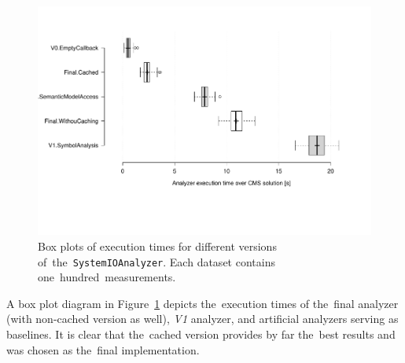 \documentclass[
  digital, %
  table,   %
  lof,     %
  lot,     %
  oneside,
]{fithesis3}
\begin{document}
\begin{figure}
		\centering
			\includegraphics[scale=0.23]{img/system-io-versions-boxpolt}
		\caption{Box plots of execution times for different versions of~the~\texttt{SystemIOAnalyzer}. Each dataset contains one~hundred~measurements.}
		\label{fig:system-io-versions-boxplots}
\end{figure}

A box plot diagram in Figure~\ref{fig:system-io-versions-boxplots} depicts the~execution times of the~final analyzer (with non-cached version as well), \textit{V1} analyzer, and artificial analyzers serving as baselines. It is clear that the~cached version provides by far the~best results and was chosen as the~final implementation.
\end{document}

